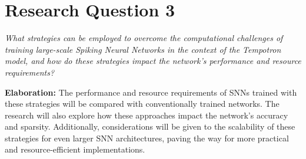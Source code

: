 \section*{Research Question 3}
\textit{What strategies can be employed to overcome the computational challenges of training large-scale Spiking Neural Networks in the context of the Tempotron model, and how do these strategies impact the network's performance and resource requirements?}

\textbf{Elaboration:}
The performance and resource requirements of SNNs trained with these strategies will be compared with conventionally trained networks. The research will also explore how these approaches impact the network's accuracy and sparsity. Additionally, considerations will be given to the scalability of these strategies for even larger SNN architectures, paving the way for more practical and resource-efficient implementations.


